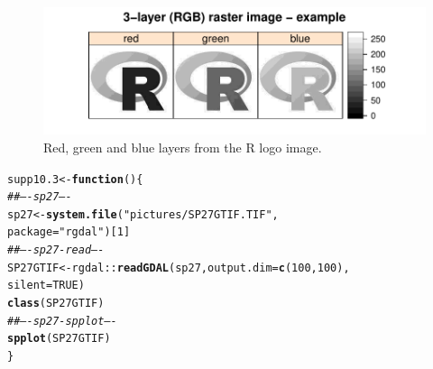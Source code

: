 \documentclass[12pt, a4paper,  BCOR=8.25mm, DIV=15]{scrartcl}\usepackage[]{graphicx}\usepackage[]{color}
\makeatletter
\def\maxwidth{ %
  \ifdim\Gin@nat@width>\linewidth
    \linewidth
  \else
    \Gin@nat@width
  \fi
}
\newcommand{\hlnum}[1]{\textcolor[rgb]{0.686,0.059,0.569}{#1}}%
\newcommand{\hlstr}[1]{\textcolor[rgb]{0.192,0.494,0.8}{#1}}%
\newcommand{\hlcom}[1]{\textcolor[rgb]{0.678,0.584,0.686}{\textit{#1}}}%
\newcommand{\hlopt}[1]{\textcolor[rgb]{0,0,0}{#1}}%
\newcommand{\hlstd}[1]{\textcolor[rgb]{0.345,0.345,0.345}{#1}}%
\newcommand{\hlkwa}[1]{\textcolor[rgb]{0.161,0.373,0.58}{\textbf{#1}}}%
\newcommand{\hlkwb}[1]{\textcolor[rgb]{0.69,0.353,0.396}{#1}}%
\newcommand{\hlkwc}[1]{\textcolor[rgb]{0.333,0.667,0.333}{#1}}%
\newcommand{\hlkwd}[1]{\textcolor[rgb]{0.737,0.353,0.396}{\textbf{#1}}}%
\newenvironment{kframe}{%
 \def\at@end@of@kframe{}%
 \ifinner\ifhmode%
  \def\at@end@of@kframe{\end{minipage}}%
  \begin{minipage}{\columnwidth}%
 \fi\fi%
 \def\FrameCommand##1{\hskip\@totalleftmargin \hskip-\fboxsep
 \colorbox{shadecolor}{##1}\hskip-\fboxsep
     \hskip-\linewidth \hskip-\@totalleftmargin \hskip\columnwidth}%
 \MakeFramed {\advance\hsize-\width
   \@totalleftmargin\z@ \linewidth\hsize
   \@setminipage}}%
 {\par\unskip\endMakeFramed%
 \at@end@of@kframe}
\newenvironment{knitrout}{}{} %
\makeatother
\begin{document}
\begin{figure}
\begin{knitrout}
\color{fgcolor}

{\centering \includegraphics[width=\maxwidth]{figs/map-spplot-col3-10_3-1} 

}



\end{knitrout}
\caption{Red, green and blue layers from the R logo image.\label{fig:rlogo3}}
\end{figure}

\begin{knitrout}
\color{fgcolor}\begin{kframe}
\begin{alltt}
\hlstd{supp10.3} \hlkwb{<-} \hlkwa{function}\hlstd{()\{}
\hlcom{## ---- sp27 ----}
\hlstd{sp27} \hlkwb{<-} \hlkwd{system.file}\hlstd{(}\hlstr{"pictures/SP27GTIF.TIF"}\hlstd{,}
                    \hlkwc{package} \hlstd{=} \hlstr{"rgdal"}\hlstd{)[}\hlnum{1}\hlstd{]}
\hlcom{## ---- sp27-read ----}
\hlstd{SP27GTIF} \hlkwb{<-} \hlstd{rgdal}\hlopt{::}\hlkwd{readGDAL}\hlstd{(sp27,} \hlkwc{output.dim}\hlstd{=}\hlkwd{c}\hlstd{(}\hlnum{100}\hlstd{,}\hlnum{100}\hlstd{),}
                     \hlkwc{silent}\hlstd{=}\hlnum{TRUE}\hlstd{)}
\hlkwd{class}\hlstd{(SP27GTIF)}
\hlcom{## ---- sp27-spplot ----}
\hlkwd{spplot}\hlstd{(SP27GTIF)}
\hlstd{\}}
\end{alltt}
\end{kframe}
\end{knitrout}
\end{document}
